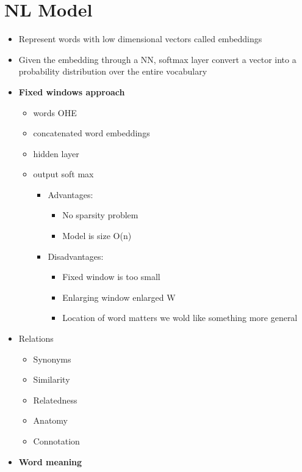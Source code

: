 \chapter{NL Model}
\begin{itemize}
    \item Represent words with low dimensional vectors called embeddings
    \item Given the embedding through a NN, softmax layer convert a vector into a probability distribution over the entire vocabulary
    \item \textbf{Fixed windows approach}
    \begin{itemize}
        \item words OHE
        \item concatenated word embeddings
        \item hidden layer
        \item output soft max
        \begin{itemize}
            \item Advantages:
            \begin{itemize}
                \item No sparsity problem
                \item Model is size O(n)
            \end{itemize}
            \item Disadvantages:
            \begin{itemize}
                \item Fixed window is too small
                \item Enlarging window enlarged W
                \item Location of word matters we wold like something more general
            \end{itemize}
        \end{itemize}
    \end{itemize}
    \item Relations
    \begin{itemize}
        \item Synonyms
        \item Similarity
        \item Relatedness
        \item Anatomy
        \item Connotation
    \end{itemize}
    \item \textbf{Word meaning}
    \begin{itemize}

\end{itemize}
\end{itemize}
